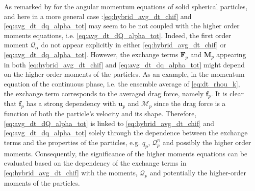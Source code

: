 As remarked by \citet{jackson1997locally} for the angular momentum equations of solid spherical particles, and here in a more general case :\ref{eq:hybrid_avg_dt_chif} and \ref{eq:avg_dt_dq_alpha_tot} may seem to be not coupled with the higher order moments equations, i.e. \ref{eq:avg_dt_dQ_alpha_tot}. 
Indeed, the first order moment $\mathcal{Q}_\alpha$ do not appear explicitly in either \ref{eq:hybrid_avg_dt_chif} or \ref{eq:avg_dt_dq_alpha_tot}.
However, the exchange terms 
$\textbf{F}_p$ 
and 
$\textbf{M}_p$ 
appearing in both \ref{eq:hybrid_avg_dt_chif} and \ref{eq:avg_dt_dq_alpha_tot} might depend on the higher order moments of the particles.
As an example, in the momentum equation of the continuous phase, i.e. the ensemble average of \ref{eq:dt_rhou_k}, the exchange term corresponds to the averaged drag force, namely $\textbf{f}_p$. 
It is clear that $\textbf{f}_p$ has a strong dependency with $\textbf{u}_p$ and $\mathcal{M}_p$ since the drag force is a function of both the particle's velocity and its shape. 
Therefore, \ref{eq:avg_dt_dQ_alpha_tot} is linked to \ref{eq:hybrid_avg_dt_chif} and \ref{eq:avg_dt_dq_alpha_tot} solely through the dependence between the exchange terms and the properties of the particles, e.g. $q_p$, $\mathcal{Q}^n_p$ and possibly the higher order moments. 
Consequently, the significance of the higher moments equations can be evaluated based on the dependency of the exchange terms in \ref{eq:hybrid_avg_dt_chif} with the moments,  $\mathcal{Q}_p$ and potentially the higher-order moments of the particles. 
